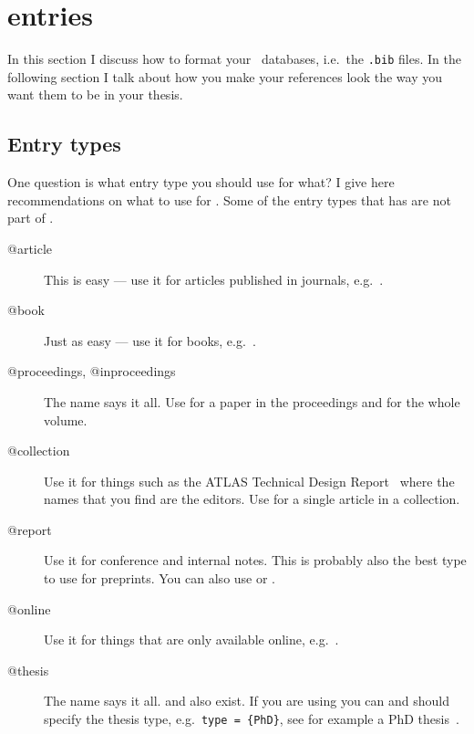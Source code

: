 \section{\BibTeX{} entries}%
\label{sec:ref:bib}

In this section I discuss how to format your \BibTeX\ databases,
i.e.\ the \texttt{.bib} files. In the following section I talk about
how you make your references look the way you want them to be in your
thesis.

\subsection{Entry types}%
\label{sec:ref:entry}

One question is what entry type you should use for what? I give here
recommendations on what to use for . Some of the entry
types that  has are not part of \BibTeX.

\begin{description}
\item[@article] This is easy --- use it for articles published in
  journals, e.g.~\cite{Abramowicz:2010ih}.
\item[@book] Just as easy --- use it for books, e.g.~\cite{kopka04}.
\item[@proceedings, @inproceedings] The name says it all. Use
   for a paper in the proceedings and
   for the whole volume.
\item[@collection] Use it for things such as the ATLAS Technical Design
  Report~\cite{lhc:vol1} where the names that you find are the
  editors. Use  for a single article in a
  collection.
\item[@report] Use it for conference and
  internal notes. This is
  probably also the best type to use for preprints. You can also use
   or .
\item[@online] Use it for things that are only available online,
  e.g.~\cite{lshort}.
\item[@thesis] The name says it all.
    and
  also exist. If you are using  you can and should specify
  the thesis type, e.g.\ \texttt{type = \{PhD\}}, see for example a
  PhD thesis~\cite{tlodd:2012}.
\end{description}

